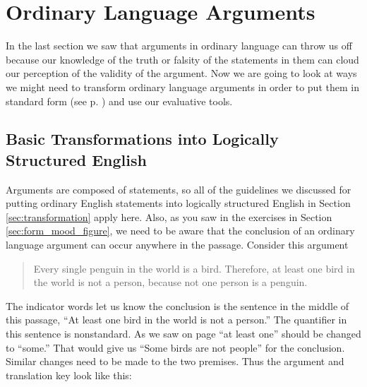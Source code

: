 {\begin{exercises}
         
\end{exercises}


\section{Ordinary Language Arguments}

In the last section we saw that arguments in ordinary language can throw us off because our knowledge of the truth or falsity of the statements in them can cloud our perception of the validity of the argument. Now we are going to look at ways we might need to transform ordinary language arguments in order to put them in standard form (see p. \pageref{standard_form_for_an_Aristotelian_syllogism}) and use our evaluative tools.  

\subsection{Basic Transformations into Logically Structured English}

Arguments are composed of statements, so all of the guidelines we discussed for putting ordinary English statements into logically structured English in Section \ref{sec:transformation} apply here. Also, as you saw in the exercises in Section \ref{sec:form_mood_figure}, we need to be aware that the conclusion of an ordinary language argument can occur anywhere in the passage. Consider this argument

\begin{quotation}
\noindent Every single penguin in the world is a bird. Therefore, at least one bird in the world is not a person, because not one person is a penguin.
\end{quotation}

The indicator words let us know the conclusion is the sentence in the middle of this passage, ``At least one bird in the world is not a person.'' The quantifier in this sentence is nonstandard. As we saw on page \pageref{subsec:nonstandard_quantifiers} ``at least one'' should be changed to ``some.'' That would give us ``Some birds are not people'' for the conclusion. Similar changes need to be made to the two premises. Thus the argument and translation key look like this: 

}
